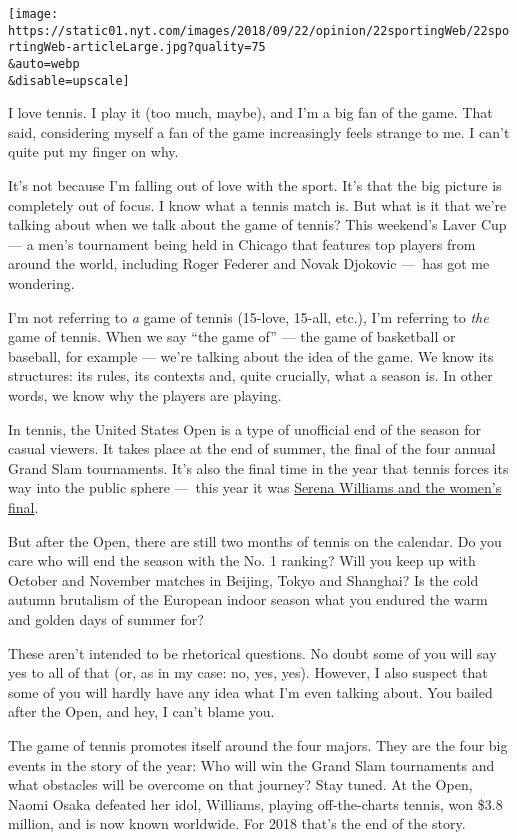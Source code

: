 \texttt{[image: https://static01.nyt.com/images/2018/09/22/opinion/22sportingWeb/22sportingWeb-articleLarge.jpg?quality=75\\\&auto=webp\\\&disable=upscale]}

I love tennis. I play it (too much, maybe), and I'm a big fan of the
game. That said, considering myself a fan of the game increasingly feels
strange to me. I can't quite put my finger on why.

It's not because I'm falling out of love with the sport. It's that the
big picture is completely out of focus. I know what a tennis match is.
But what is it that we're talking about when we talk about the game of
tennis? This weekend's Laver Cup --- a men's tournament being held in
Chicago that features top players from around the world, including Roger
Federer and Novak Djokovic ---~has got me wondering.

I'm not referring to \emph{a} game of tennis (15-love, 15-all, etc.),
I'm referring to \emph{the} game of tennis. When we say ``the game of''
--- the game of basketball or baseball, for example --- we're talking
about the idea of the game. We know its structures: its rules, its
contexts and, quite crucially, what a season is. In other words, we know
why the players are playing.

In tennis, the United States Open is a type of unofficial end of the
season for casual viewers. It takes place at the end of summer, the
final of the four annual Grand Slam tournaments. It's also the final
time in the year that tennis forces its way into the public sphere
---~this year it was
\href{https://www.nytimes.com/2018/09/09/sports/serena-williams-us-open-naomi-osaka.html}{Serena
Williams and the women's final}.

But after the Open, there are still two months of tennis on the
calendar. Do you care who will end the season with the No. 1 ranking?
Will you keep up with October and November matches in Beijing, Tokyo and
Shanghai? Is the cold autumn brutalism of the European indoor season
what you endured the warm and golden days of summer for?

These aren't intended to be rhetorical questions. No doubt some of you
will say yes to all of that (or, as in my case: no, yes, yes). However,
I also suspect that some of you will hardly have any idea what I'm even
talking about. You bailed after the Open, and hey, I can't blame you.

The game of tennis promotes itself around the four majors. They are the
four big events in the story of the year: Who will win the Grand Slam
tournaments and what obstacles will be overcome on that journey? Stay
tuned. At the Open, Naomi Osaka defeated her idol, Williams, playing
off-the-charts tennis, won \$3.8 million, and is now known worldwide.
For 2018 that's the end of the story.


